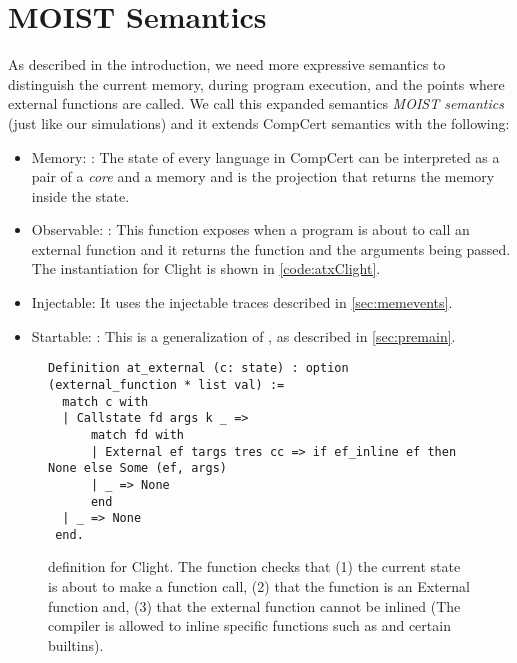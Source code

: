 \section{MOIST Semantics }\label{sec:compcert-sem}

As described in the introduction, we need more expressive semantics to distinguish the current memory, during program execution, and the points where external functions are called. We call this expanded semantics \emph{MOIST semantics} (just like our simulations) and it extends CompCert semantics with the following:


\begin{itemize}
\item Memory: : The state of every language in CompCert can be interpreted as a pair of a \emph{core} and a memory \cite{bsda:esop2014} and  is the projection that returns the memory inside the state. %
\item  Observable:  : This function exposes when a program is about to call an external function and it returns the function and the arguments being passed. The instantiation for Clight is shown in \autoref{code:atxClight}.
\item Injectable: It uses the injectable traces described in \autoref{sec:memevents}.
\item Startable: : This is a generalization of , as described in \autoref{sec:premain}.
\end{itemize}    

\begin{figure}
\begin{lstlisting}
Definition at_external (c: state) : option (external_function * list val) :=
  match c with
  | Callstate fd args k _ =>
      match fd with
      | External ef targs tres cc => if ef_inline ef then None else Some (ef, args)
      | _ => None
      end
  | _ => None
 end.
\end{lstlisting}
\caption[ definition for Clight]{ definition for Clight. The function checks that 
(1) the current state is about to make a function call, 
(2) that the function is an External function and, 
(3) that the external function cannot be inlined (The compiler is allowed to inline specific functions such as  and certain builtins). }\label{code:atxClight}
\end{figure}



